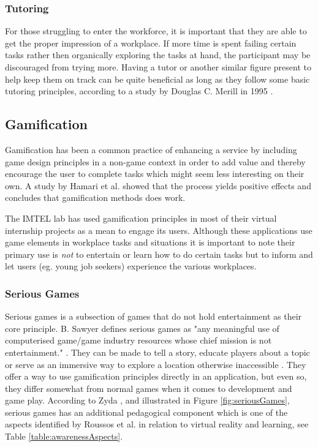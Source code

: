 \subsubsection{Tutoring}
For those struggling to enter the workforce, it is important that they are able to get the proper impression of a workplace. If more time is spent failing certain tasks rather then organically exploring the tasks at hand, the participant may be discouraged from trying more. Having a tutor or another similar figure present to help keep them on track can be quite beneficial as long as they follow some basic tutoring principles, according to a study by Douglas C. Merill in 1995 \cite{merrill1995tutoring}.

\subsection{Gamification}
Gamification has been a common practice of enhancing a service by including game design principles in a non-game context in order to add value and thereby encourage the user to complete tasks which might seem less interesting on their own. A study by Hamari et al. \cite{hamari2014does} showed that the process yields positive effects and concludes that gamification methods does work.

The IMTEL lab has used gamification principles in most of their virtual internship projects as a mean to engage its users. Although these applications use game elements in workplace tasks and situations it is important to note their primary use is \textit{not} to entertain or learn how to do certain tasks but to inform and let users (eg. young job seekers) experience the various workplaces.      

\subsubsection{Serious Games}
Serious games is a subsection of games that do not hold entertainment as their core principle. B. Sawyer defines serious games as "any meaningful use of computerised game/game industry resources whose chief mission is not entertainment." \cite{sawyer2007serious}.
They can be made to tell a story, educate players about a topic or serve as an immersive way to explore a location otherwise inaccessible \cite{susi2007serious}. They offer a way to use gamification principles directly in an application, but even so, they differ somewhat from normal games when it comes to development and game play. According to Zyda \cite{zyda2005visual}, and illustrated in Figure \ref{fig:seriousGames}, serious games has an additional pedagogical component which is one of the aspects identified by Roussos et al. in relation to virtual reality and learning, see Table \ref{table:awarenessAspects}.   

